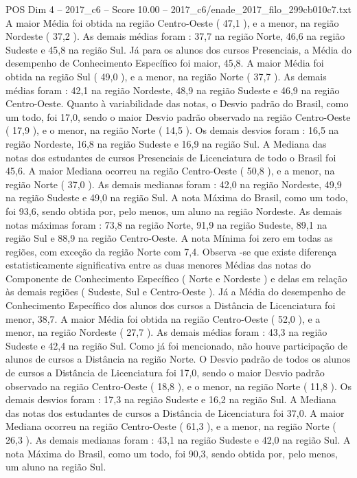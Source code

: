 \begin{textsample}{POS Dim 4 – 2017\_c6 – Score 10.00 – 2017\_c6/enade\_2017\_filo\_299cb010c7.txt}
A maior Média foi obtida na região Centro-Oeste ( 47,1 ), e a menor, na região Nordeste ( 37,2 ).
As demais médias foram : 37,7 na região Norte, 46,6 na região Sudeste e 45,8 na região Sul.
Já para os alunos dos cursos Presenciais, a Média do desempenho de Conhecimento Específico foi maior, 45,8.
A maior Média foi obtida na região Sul ( 49,0 ), e a menor, na região Norte ( 37,7 ).
As demais médias foram : 42,1 na região Nordeste, 48,9 na região Sudeste e 46,9 na região Centro-Oeste.
Quanto à variabilidade das notas, o Desvio padrão do Brasil, como um todo, foi 17,0, sendo o maior Desvio padrão observado na região Centro-Oeste ( 17,9 ), e o menor, na região Norte ( 14,5 ).
Os demais desvios foram : 16,5 na região Nordeste, 16,8 na região Sudeste e 16,9 na região Sul.
A Mediana das notas dos estudantes de cursos Presenciais de Licenciatura de todo o Brasil foi 45,6.
A maior Mediana ocorreu na região Centro-Oeste ( 50,8 ), e a menor, na região Norte ( 37,0 ).
As demais medianas foram : 42,0 na região Nordeste, 49,9 na região Sudeste e 49,0 na região Sul.
A nota Máxima do Brasil, como um todo, foi 93,6, sendo obtida por, pelo menos, um aluno na região Nordeste.
As demais notas máximas foram : 73,8 na região Norte, 91,9 na região Sudeste, 89,1 na região Sul e 88,9 na região Centro-Oeste.
A nota Mínima foi zero em todas as regiões, com exceção da região Norte com 7,4.
Observa -se que existe diferença estatisticamente significativa entre as duas menores Médias das notas do Componente de Conhecimento Específico ( Norte e Nordeste ) e delas em relação às demais regiões ( Sudeste, Sul e Centro-Oeste ).
Já a Média do desempenho de Conhecimento Específico dos alunos dos cursos a Distância de Licenciatura foi menor, 38,7.
A maior Média foi obtida na região Centro-Oeste ( 52,0 ), e a menor, na região Nordeste ( 27,7 ).
As demais médias foram : 43,3 na região Sudeste e 42,4 na região Sul.
Como já foi mencionado, não houve participação de alunos de cursos a Distância na região Norte.
O Desvio padrão de todos os alunos de cursos a Distância de Licenciatura foi 17,0, sendo o maior Desvio padrão observado na região Centro-Oeste ( 18,8 ), e o menor, na região Norte ( 11,8 ).
Os demais desvios foram : 17,3 na região Sudeste e 16,2 na região Sul.
A Mediana das notas dos estudantes de cursos a Distância de Licenciatura foi 37,0.
A maior Mediana ocorreu na região Centro-Oeste ( 61,3 ), e a menor, na região Norte ( 26,3 ).
As demais medianas foram : 43,1 na região Sudeste e 42,0 na região Sul.
A nota Máxima do Brasil, como um todo, foi 90,3, sendo obtida por, pelo menos, um aluno na região Sul.

\end{textsample}
